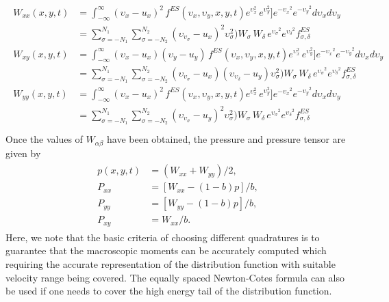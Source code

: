 \documentclass{rsproca}%
\begin{document}
\begin{align}
	\begin{split}
W_{xx}(x,y,t) &= \int^{\infty}_{-\infty} (\upsilon_x - u_x)^2 \, f^{ES}(\upsilon_x,\upsilon_y,x,y,t) e^{\upsilon_x^2}\,e^{\upsilon_y^2}] e^{-{\upsilon_x}^2} e^{-{\upsilon_y}^2} d\upsilon_x d\upsilon_y \\
&= \sum^{N_1}_{\sigma=-N_1}\sum^{N_2}_{\sigma=-N_2} (\upsilon_{\upsilon_\sigma} - u_x)^2 {\upsilon^2_\sigma})W_\sigma\,W_\delta\,e^{{\upsilon_\sigma}^2}e^{{\upsilon_\delta}^2}f^{ES}_{\sigma,\delta}  \\
W_{xy}(x,y,t) &= \int^{\infty}_{-\infty} (\upsilon_x - u_x) (\upsilon_y - u_y) \, f^{ES}(\upsilon_x,\upsilon_y,x,y,t) e^{\upsilon_x^2}\,e^{\upsilon_y^2}] e^{-{\upsilon_x}^2} e^{-{\upsilon_y}^2} d\upsilon_x d\upsilon_y \\
&= \sum^{N_1}_{\sigma=-N_1}\sum^{N_2}_{\sigma=-N_2} (\upsilon_{\upsilon_\sigma} - u_x) (\upsilon_{\upsilon_\delta} - u_y) {\upsilon^2_\sigma})W_\sigma\,W_\delta\,e^{{\upsilon_\sigma}^2}e^{{\upsilon_\delta}^2}f^{ES}_{\sigma,\delta}  \\
W_{yy}(x,y,t) &= \int^{\infty}_{-\infty} (\upsilon_x - u_x)^2 \, f^{ES}(\upsilon_x,\upsilon_y,x,y,t) e^{\upsilon_x^2}\,e^{\upsilon_y^2}] e^{-{\upsilon_x}^2} e^{-{\upsilon_y}^2} d\upsilon_x d\upsilon_y \\
&= \sum^{N_1}_{\sigma=-N_1}\sum^{N_2}_{\sigma=-N_2} (\upsilon_{\upsilon_\sigma} - u_y)^2 {\upsilon^2_\sigma})W_\sigma\,W_\delta\,e^{{\upsilon_\sigma}^2}e^{{\upsilon_\delta}^2}f^{ES}_{\sigma,\delta}  \\
	\end{split}
\end{align}
Once the values of $W_{\alpha \beta}$ have been obtained, the pressure and pressure tensor are given by
\begin{align}
	\begin{split}
p(x,y,t) 	&= (W_{xx} + W_{yy})/2, \\
P_{xx} 		&= [W_{xx} - (1-b)p]/b, \\
P_{yy} 		&= [W_{yy} - (1-b)p]/b, \\
P_{xy} 		&= W_{xx}/b.
	\end{split}
\end{align}
Here, we note that the basic criteria of choosing different quadratures is to guarantee that the macroscopic moments can be accurately computed which requiring the accurate representation of the distribution function with suitable velocity range being covered.   The equally spaced Newton-Cotes formula can also be used if one needs to cover the high energy tail of the distribution function.
\end{document}
